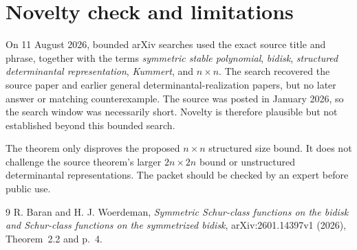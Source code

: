 \documentclass[11pt]{article}
\begin{document}
\section*{Novelty check and limitations}
On 11 August 2026, bounded arXiv searches used the exact source title and phrase, together with the terms \emph{symmetric stable polynomial}, \emph{bidisk}, \emph{structured determinantal representation}, \emph{Kummert}, and \emph{$n\times n$}.  The search recovered the source paper and earlier general determinantal-realization papers, but no later answer or matching counterexample.  The source was posted in January 2026, so the search window was necessarily short.  Novelty is therefore plausible but not established beyond this bounded search.

The theorem only disproves the proposed $n\times n$ structured size bound.  It does not challenge the source theorem's larger $2n\times2n$ bound or unstructured determinantal representations.  The packet should be checked by an expert before public use.

{\raggedright
\begin{thebibliography}{9}
R. Baran and H. J. Woerdeman,
\emph{Symmetric Schur-class functions on the bidisk and Schur-class functions on the symmetrized bidisk},
arXiv:2601.14397v1 (2026), Theorem~2.2 and p.~4.
\end{thebibliography}
\par}
\end{document}
